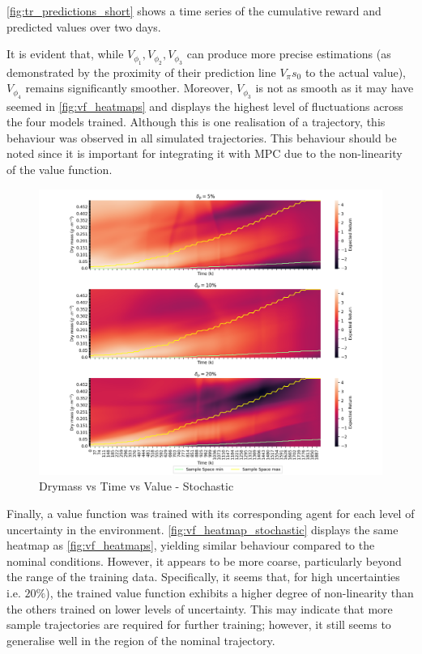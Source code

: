 	


\autoref{fig:tr_predictions_short} shows a time series of the cumulative reward and predicted values over two days.
 

\begin{remark}\label{rem:vf-smoothness}
	It is evident that, while $V_{\phi_1}, V_{\phi_2}, V_{\phi_3}$ can produce more precise estimations (as demonstrated by the proximity of their prediction line $V_{\pi}{s_0}$ to the actual value), $V_{\phi_4}$ remains significantly smoother. Moreover, $V_{\phi_3}$  is not as smooth as it may have seemed in \autoref{fig:vf_heatmaps} and displays the highest level of fluctuations across the four models trained. Although this is one realisation of a trajectory, this behaviour was observed in all simulated trajectories. This behaviour should be noted since it is important for integrating it with MPC due to the non-linearity of the value function.
\end{remark}



\begin{figure}[H]
	\centering
	\includegraphics[width = \textwidth]{figures/vf_heatmap_stochastic_test.png}
	\caption{Drymass vs Time vs Value - Stochastic}
	\label{fig:vf_heatmap_stochastic}
\end{figure}


Finally, a value function was trained with its corresponding agent for each level of uncertainty in the environment. \autoref{fig:vf_heatmap_stochastic} displays the same heatmap as \autoref{fig:vf_heatmaps}, yielding similar behaviour compared to the nominal conditions. However, it appears to be more coarse, particularly beyond the range of the training data. Specifically, it seems that, for high uncertainties i.e. $20\%$), the trained value function exhibits a higher degree of non-linearity than the others trained on lower levels of uncertainty. This may indicate that more sample trajectories are required for further training; however, it still seems to generalise well in the region of the nominal trajectory.

